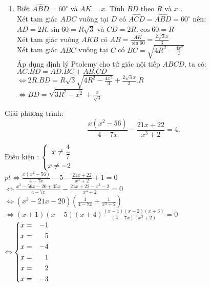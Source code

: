 \begin{ex}
{\begin{enumerate}
        \item Biết $\widehat{ABD}=60^ \circ$ và $AK=x$. Tính $BD$ theo $R$ và $x$ .\\
        Xét tam giác $ADC$ vuông tại $D$ có $\widehat{ACD}= \widehat{ABD}= 60^ \circ$ nên:\\
        $AD=2R. \sin 60 = R \sqrt{3}$ và $CD= 2R. \cos 60 = R$\\
        Xét tam giác vuông $AKB$ có $AB= \displaystyle \frac{AK}{\sin 60}= \displaystyle \frac{2\sqrt{3}x}{3}$\\
        Xét tam giác $ABC$ vuông tại $C$ có $BC=\sqrt{4R^2- \displaystyle \frac{4x^2}{3}}$\\
        Áp dụng định lý Ptolemy cho tứ giác nội tiếp $ABCD$, ta có:\\
        $AC.BD=AD.BC+AB.CD$\\
        $\Leftrightarrow 2R.BD=R \sqrt{3} \sqrt{4R^2 - \displaystyle \frac{4x^2}{3}}+ \displaystyle \frac{2\sqrt{3}x}{3}.R$\\
        $\Leftrightarrow BD= \sqrt{3R^2-x^2}+\displaystyle \frac{x}{\sqrt{3}}$
    \end{enumerate}
    }
\end{ex}
\begin{ex}%
Giải phương trình: \[ \displaystyle \frac{x(x^2-56)}{4-7x}- \displaystyle \frac{21x+22}{x^3+2}=4.\]
\loigiai
{Điều kiện : $\left\{\begin{aligned}x \neq \frac{4}{7} \\ x \neq -2\end{aligned}\right.$\\
$pt \Leftrightarrow \displaystyle \frac{x(x^2-56)}{4-7x} -5 - \displaystyle \frac{21x+22}{x^3+2}+1 =0 $\\
$ \Leftrightarrow \displaystyle \frac{x^3 -56x -20 +35x}{4 - 7x}- \displaystyle \frac{21x+22-x^3-2}{x^3+2}=0$\\
$\Leftrightarrow (x^3-21x-20)(\displaystyle \frac{1}{4-7x}+ \displaystyle \frac{1}{x^3+2})$\\
$\Leftrightarrow(x+1)(x-5)(x+4)\displaystyle \frac{(x-1)(x-2)(x+3)}{(4-7x)(x^3+2)}=0$\\
$\Leftrightarrow \left\{\begin{aligned}x &=&-1 \\ x&=& 5 \\ x&=& -4 \\ x&=& 1 \\ x&=& 2\\ x&=& -3 \end{aligned}\right.$

}
\end{ex}

